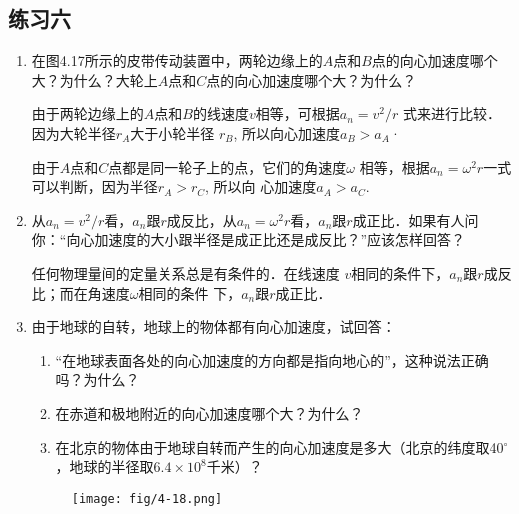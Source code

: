 \subsection{练习六}
\begin{enumerate}
	\item 在图4.17所示的皮带传动装置中，两轮边缘上的$A$点和$B$点的向心加速度哪个大？为什么？大轮上$A$点和$C$点的向心加速度哪个大？为什么？

    \begin{solution}
由于两轮边缘上的$A$点和$B$的线速度$v$相等，可根据$a_n=v^2/r$
式来进行比较．因为大轮半径$r_A$大于小轮半径
$r_B$, 所以向心加速度$a_B>a_A$·

由于$A$点和$C$点都是同一轮子上的点，它们的角速度$\omega$
相等，根据$a_n=\omega^2r$一式可以判断，因为半径$r_A>r_C$, 所以向
心加速度$a_A>a_C$.    
    \end{solution}
	\item 从$a_n=v^2/r$看，$a_n$跟$r$成反比，从$a_n=\omega^2r$看，$a_n$跟$r$成正比．如果有人问你：“向心加速度的大小跟半径是成正比还是成反比？”应该怎样回答？

    \begin{solution}
    任何物理量间的定量关系总是有条件的．在线速度
$v$相同的条件下，$a_n$跟$r$成反比；而在角速度$\omega$相同的条件
下，$a_n$跟$r$成正比．
    \end{solution}
	\item 由于地球的自转，地球上的物体都有向心加速度，试回答：
\begin{enumerate}
	\item “在地球表面各处的向心加速度的方向都是指向地心的”，这种说法正确吗？为什么？
	\item 在赤道和极地附近的向心加速度哪个大？为什么？
	\item 在北京的物体由于地球自转而产生的向心加速度是多大（北京的纬度取40$^\circ$，地球的半径取$6.4\times 10^8$千米）？	
\end{enumerate}

\begin{figure}[htp]
    \centering
    \texttt{[image: fig/4-18.png]}
    \caption{}
    \end{figure}


\end{enumerate}
